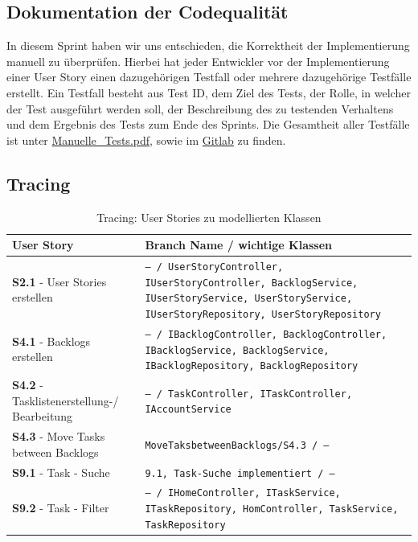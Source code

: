 \documentclass[a4paper,11pt]{article}
\begin{document}
\subsection{Dokumentation der Codequalität}
In diesem Sprint haben wir uns entschieden, die Korrektheit der Implementierung manuell zu überprüfen.
Hierbei hat jeder Entwickler vor der Implementierung einer User Story einen dazugehörigen Testfall oder mehrere dazugehörige Testfälle erstellt.
Ein Testfall besteht aus Test ID, dem Ziel des Tests, der Rolle, in welcher der Test ausgeführt werden soll, der Beschreibung des zu testenden Verhaltens und dem Ergebnis des Tests zum Ende des Sprints.
Die Gesamtheit aller Testfälle ist unter \href{run:./Manuelle_Tests.pdf}{Manuelle\_Tests.pdf}, sowie im \href{https://git.informatik.uni-rostock.de/softwaretechnik-ws-2025-26/uebung3/team3/projekt-team3-uebung3/-/blob/main/abgabedokumente/Manuelle_Tests.pdf?ref_type=heads}{Gitlab} zu finden.


\subsection{Tracing}

\begin{table}[h]
\centering
\small
\renewcommand{\arraystretch}{1.4}
\begin{tabular}{| p{3.5cm} | p{10cm} |}
\hline
\textbf{User Story} & \textbf{Branch Name / wichtige Klassen} \\
\hline
\textbf{S2.1} - User Stories erstellen &
\texttt{-- / UserStoryController, IUserStoryController, BacklogService, IUserStoryService, UserStoryService, IUserStoryRepository, UserStoryRepository} \\
\hline
\textbf{S4.1} - Backlogs erstellen &
\texttt{-- / IBacklogController, BacklogController, IBacklogService, BacklogService, IBacklogRepository, BacklogRepository} \\
\hline
\textbf{S4.2} - Tasklistenerstellung-/ Bearbeitung &
\texttt{-- / TaskController, ITaskController, IAccountService} \\
\hline
\textbf{S4.3} - Move Tasks between Backlogs &
\texttt{MoveTaksbetweenBacklogs/S4.3 / --} \\
\hline
\textbf{S9.1} - Task - Suche &
\texttt{9.1, Task-Suche implementiert / --} \\
\hline
\textbf{S9.2} - Task - Filter &
\texttt{-- / IHomeController, ITaskService, ITaskRepository, HomController, TaskService, TaskRepository} \\
\hline

\end{tabular}
\caption{Tracing: User Stories zu modellierten Klassen}
\end{table}
\end{document}
